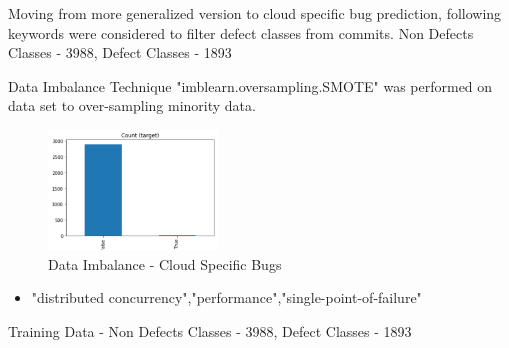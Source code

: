 \documentclass{seal_article}
\begin{document}
Moving from more generalized version to cloud specific bug prediction, following keywords were considered to filter defect classes from commits.
Non Defects Classes - 3988, Defect Classes - 1893


Data Imbalance Technique "imblearn.oversampling.SMOTE" was performed on data set to over-sampling minority data.
\vspace{0.5cm}
\begin{figure}[H]
\centering
    \includegraphics[width=0.4\textwidth]{img/Data_Imbalance_Cloud_Specific_Bugs.PNG}
    \caption{Data Imbalance - Cloud Specific Bugs}
    \label{fig:perc-cloudapps-categories}
\end{figure}
\vspace{0.5cm}
\begin{itemize}
\item "distributed concurrency","performance","single-point-of-failure"
\end{itemize}
\vspace{0.5cm}



Training Data - Non Defects Classes - 3988, Defect Classes - 1893
\end{document}
